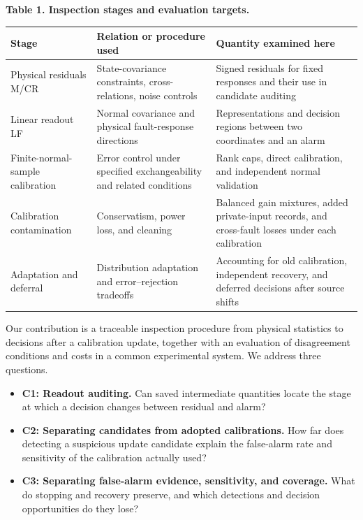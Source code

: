 \documentclass[10pt,a4paper]{article}
\newlength{\usable}
\begin{document}
\begin{table}[H]\fontsize{9.3}{12}\selectfont
\setlength{\usable}{\dimexpr\linewidth-4\tabcolsep\relax}
{\raggedright \textbf{Table 1. Inspection stages and evaluation targets.}\par}\vspace{3pt}
\noindent\begin{tabular}{@{}>{\raggedright\arraybackslash}p{0.21\usable}>{\raggedright\arraybackslash}p{0.34\usable}>{\raggedright\arraybackslash}p{0.45\usable}@{}}
\toprule
\bfseries Stage & \bfseries Relation or procedure used & \bfseries Quantity examined here \\
\midrule
Physical residuals M/CR & State-covariance constraints, cross-relations, noise controls & Signed residuals for fixed responses and their use in candidate auditing \\
Linear readout LF & Normal covariance and physical fault-response directions & Representations and decision regions between two coordinates and an alarm \\
Finite-normal-sample calibration & Error control under specified exchangeability and related conditions & Rank caps, direct calibration, and independent normal validation \\
Calibration contamination & Conservatism, power loss, and cleaning & Balanced gain mixtures, added private-input records, and cross-fault losses under each calibration \\
Adaptation and deferral & Distribution adaptation and error–rejection tradeoffs & Accounting for old calibration, independent recovery, and deferred decisions after source shifts \\
\bottomrule\end{tabular}\end{table}

Our contribution is a traceable inspection procedure from physical statistics to decisions after a calibration update, together with an evaluation of disagreement conditions and costs in a common experimental system. We address three questions.

\begin{itemize}\setlength{\itemsep}{2pt}
\item \textbf{C1: Readout auditing.} Can saved intermediate quantities locate the stage at which a decision changes between residual and alarm?
\item \textbf{C2: Separating candidates from adopted calibrations.} How far does detecting a suspicious update candidate explain the false-alarm rate and sensitivity of the calibration actually used?
\item \textbf{C3: Separating false-alarm evidence, sensitivity, and coverage.} What do stopping and recovery preserve, and which detections and decision opportunities do they lose?
\end{itemize}
\end{document}

